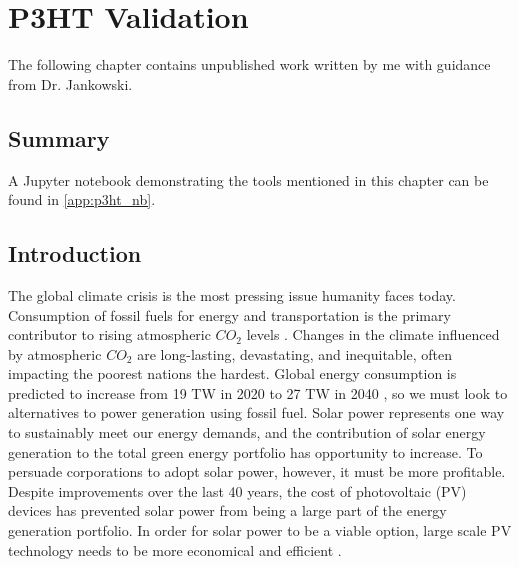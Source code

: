 \chapter{P3HT Validation}
\label{chap:p3ht_validation}

The following chapter contains unpublished work written by me with guidance from Dr. Jankowski.

\section{Summary}
 
A Jupyter notebook demonstrating the tools mentioned in this chapter can be found in \autoref{app:p3ht_nb}.

\section{Introduction}
The global climate crisis is the most pressing issue humanity faces today.
Consumption of fossil fuels for energy and transportation is the primary contributor to rising atmospheric $CO_{2}$ levels \citep{Solomon2009a}.
Changes in the climate influenced by atmospheric $CO_{2}$ are long-lasting, devastating, and inequitable, often impacting the poorest nations the hardest.
Global energy consumption is predicted to increase from 19 TW in 2020 to 27 TW in 2040 \citep{Mazzio2015, ieo2020}, so we must look to alternatives to power generation using fossil fuel.
Solar power represents one way to sustainably meet our energy demands, and the contribution of solar energy generation to the total green energy portfolio has opportunity to increase.
To persuade corporations to adopt solar power, however, it must be more profitable.
Despite improvements over the last 40 years, the cost of photovoltaic (PV) devices has prevented solar power from being a large part of the energy generation portfolio.
In order for solar power to be a viable option, large scale PV technology needs to be more economical and efficient \citep{Mazzio2015, Espinosa2012}.

